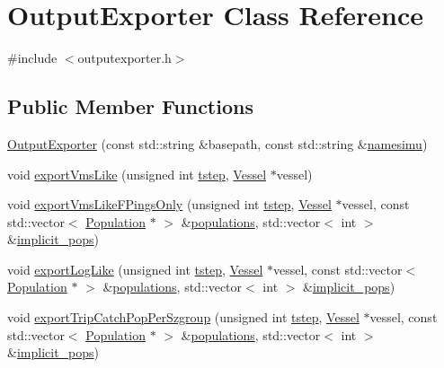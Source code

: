 \hypertarget{class_output_exporter}{}\section{Output\+Exporter Class Reference}
\label{class_output_exporter}


{\ttfamily \#include $<$outputexporter.\+h$>$}

\subsection*{Public Member Functions}
\begin{DoxyCompactItemize}
\item 
\mbox{\hyperlink{class_output_exporter_a178e92b8ff983ba114d1fb3fe362f542}{Output\+Exporter}} (const std\+::string \&basepath, const std\+::string \&\mbox{\hyperlink{simulator_2main_8cpp_a44a282d0a5b623c9d3e1d35def57a3fe}{namesimu}})
\item 
void \mbox{\hyperlink{class_output_exporter_a74907417fa0cded047e32b8ceb16b1e7}{export\+Vms\+Like}} (unsigned int \mbox{\hyperlink{thread__vessels_8cpp_a84bc73d278de929ec9974e1a95d9b23a}{tstep}}, \mbox{\hyperlink{class_vessel}{Vessel}} $\ast$vessel)
\item 
void \mbox{\hyperlink{class_output_exporter_a07907c5123462b2da0d3440f50b32c0c}{export\+Vms\+Like\+F\+Pings\+Only}} (unsigned int \mbox{\hyperlink{thread__vessels_8cpp_a84bc73d278de929ec9974e1a95d9b23a}{tstep}}, \mbox{\hyperlink{class_vessel}{Vessel}} $\ast$vessel, const std\+::vector$<$ \mbox{\hyperlink{class_population}{Population}} $\ast$ $>$ \&\mbox{\hyperlink{thread__vessels_8cpp_a52b340841e812112c424c384bb9e7ebc}{populations}}, std\+::vector$<$ int $>$ \&\mbox{\hyperlink{thread__vessels_8cpp_a249b6522d595e6a057580471ab5a4517}{implicit\+\_\+pops}})
\item 
void \mbox{\hyperlink{class_output_exporter_adee23d0c132a6b245e30a20816c6f8c0}{export\+Log\+Like}} (unsigned int \mbox{\hyperlink{thread__vessels_8cpp_a84bc73d278de929ec9974e1a95d9b23a}{tstep}}, \mbox{\hyperlink{class_vessel}{Vessel}} $\ast$vessel, const std\+::vector$<$ \mbox{\hyperlink{class_population}{Population}} $\ast$ $>$ \&\mbox{\hyperlink{thread__vessels_8cpp_a52b340841e812112c424c384bb9e7ebc}{populations}}, std\+::vector$<$ int $>$ \&\mbox{\hyperlink{thread__vessels_8cpp_a249b6522d595e6a057580471ab5a4517}{implicit\+\_\+pops}})
\item 
void \mbox{\hyperlink{class_output_exporter_a0f2597e953d3a28ff1bb721b800fdd8a}{export\+Trip\+Catch\+Pop\+Per\+Szgroup}} (unsigned int \mbox{\hyperlink{thread__vessels_8cpp_a84bc73d278de929ec9974e1a95d9b23a}{tstep}}, \mbox{\hyperlink{class_vessel}{Vessel}} $\ast$vessel, const std\+::vector$<$ \mbox{\hyperlink{class_population}{Population}} $\ast$ $>$ \&\mbox{\hyperlink{thread__vessels_8cpp_a52b340841e812112c424c384bb9e7ebc}{populations}}, std\+::vector$<$ int $>$ \&\mbox{\hyperlink{thread__vessels_8cpp_a249b6522d595e6a057580471ab5a4517}{implicit\+\_\+pops}})

\end{DoxyCompactItemize}
